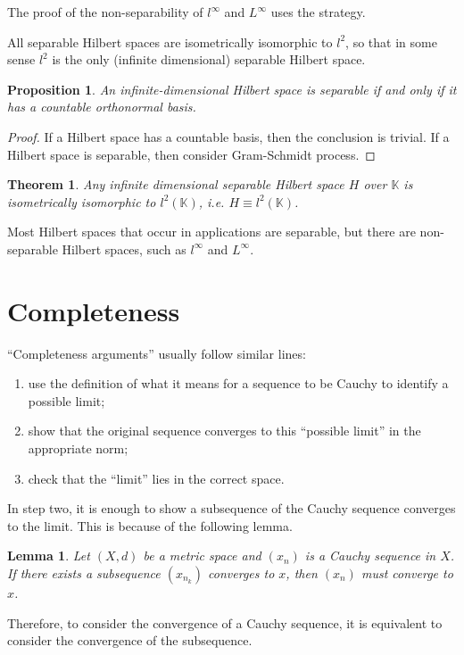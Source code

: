 \documentclass[12pt,a4paper]{report}
\numberwithin{equation}{section}
\theoremstyle{mystyle}
\newtheorem{theorem}[definition]{Theorem}
\newtheorem{lemma}[definition]{Lemma}
\newtheorem{proposition}[definition]{Proposition}
\newcommand{\K}{\mathbb{K}}
\begin{document}
	The proof of the non-separability of $l^\infty$ and $L^\infty$ uses the strategy.
	
	All separable Hilbert spaces are isometrically isomorphic to $l^2$, so that in some sense $l^2$ is the only (infinite dimensional) separable Hilbert space.
	\begin{proposition}
		An infinite-dimensional Hilbert space is separable if and only if it has a countable orthonormal basis.
	\end{proposition}
	\begin{proof}
		If a Hilbert space has a countable basis, then the conclusion is trivial. If a Hilbert space is separable, then consider Gram-Schmidt process.
	\end{proof}

	\begin{theorem}\label{thm:basis}
		Any infinite dimensional separable Hilbert space $H$ over $\K$ is isometrically isomorphic to $l^2(\K)$, i.e. $H\equiv l^2(\K)$.
	\end{theorem}

	Most Hilbert spaces that occur in applications are separable, but there are non-separable Hilbert spaces, such as $l^\infty$ and $L^\infty$.

	
	\section{Completeness}
	``Completeness arguments'' usually follow similar lines:
	\begin{enumerate}
		\item use the definition of what it means for a sequence to be Cauchy to identify a possible limit;
		\item show that the original sequence converges to this ``possible limit'' in the appropriate norm;
		\item check that the ``limit'' lies in the correct space.
	\end{enumerate}
	In step two, it is enough to show a subsequence of the Cauchy sequence converges to the limit. This is because of the following lemma.
	\begin{lemma}
		Let $(X,d)$ be a metric space and $(x_n)$ is a Cauchy sequence in $X$. If there exists a subsequence $(x_{n_k})$ converges to $x$, then $(x_n)$ must converge to $x$.
	\end{lemma}
	Therefore, to consider the convergence of a Cauchy sequence, it is equivalent to consider the convergence of the subsequence.
\end{document}
